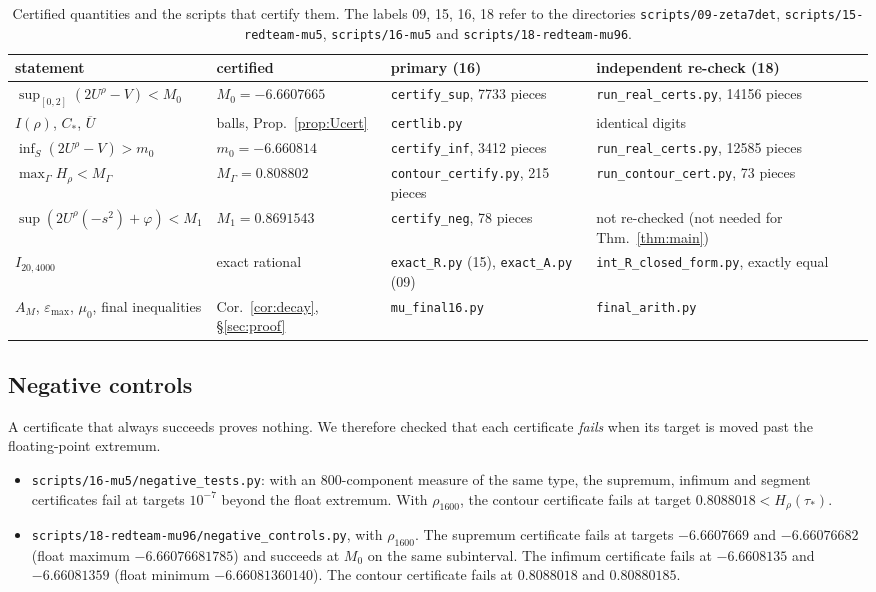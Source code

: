 \documentclass[11pt]{article}
\theoremstyle{remark}
\newcommand{\Ubar}{\overline{U}}
\newcommand{\epsmax}{\varepsilon_{\max}}
\newcommand{\file}[1]{\texttt{#1}}
\newcommand{\Cstar}{C_{*}}
\begin{document}
\begin{table}[ht]
\centering
\small
\begin{tabular}{>{\raggedright}p{3.9cm}>{\raggedright}p{3.0cm}>{\raggedright}p{3.4cm}>{\raggedright\arraybackslash}p{4.2cm}}
\toprule
statement & certified & primary (16) & independent re-check (18)\\
\midrule
$\sup_{[0,2]}(2U^\rho-V)<M_0$ & $M_0=-6.6607665$ & \file{certify\_sup}, 7733 pieces & \file{run\_real\_certs.py}, 14156 pieces\\
$I(\rho)$, $\Cstar$, $\Ubar$ & balls, Prop.~\ref{prop:Ucert} & \file{certlib.py} & identical digits\\
$\inf_S(2U^\rho-V)>m_0$ & $m_0=-6.660814$ & \file{certify\_inf}, 3412 pieces & \file{run\_real\_certs.py}, 12585 pieces\\
$\max_\Gamma H_\rho<M_\Gamma$ & $M_\Gamma=0.808802$ & \file{contour\_certify.py}, 215 pieces & \file{run\_contour\_cert.py}, 73 pieces\\
$\sup(2U^\rho(-s^2)+\varphi)<M_1$ & $M_1=0.8691543$ & \file{certify\_neg}, 78 pieces & not re-checked (not needed for Thm.~\ref{thm:main})\\
$I_{20,4000}$ & exact rational & \file{exact\_R.py} (15), \file{exact\_A.py} (09) & \file{int\_R\_closed\_form.py}, exactly equal\\
$A_M$, $\epsmax$, $\mu_0$, final inequalities & Cor.~\ref{cor:decay}, \S\ref{sec:proof} & \file{mu\_final16.py} & \file{final\_arith.py}\\
\bottomrule
\end{tabular}
\caption{Certified quantities and the scripts that certify them. The labels 09, 15, 16, 18 refer to the directories \file{scripts/09-zeta7det}, \file{scripts/15-redteam-mu5}, \file{scripts/16-mu5} and \file{scripts/18-redteam-mu96}.}
\label{tab:certs}
\end{table}

\subsection{Negative controls}

A certificate that always succeeds proves nothing. We therefore checked that each certificate \emph{fails} when its target is moved past the floating-point extremum.
\begin{itemize}
\item \file{scripts/16-mu5/negative\_tests.py}: with an $800$-component measure of the same type, the supremum, infimum and segment certificates fail at targets $10^{-7}$ beyond the float extremum. With $\rho_{1600}$, the contour certificate fails at target $0.8088018<H_\rho(\tau_*)$.
\item \file{scripts/18-redteam-mu96/negative\_controls.py}, with $\rho_{1600}$. The supremum certificate fails at targets $-6.6607669$ and $-6.66076682$ (float maximum $-6.66076681785$) and succeeds at $M_0$ on the same subinterval. The infimum certificate fails at $-6.6608135$ and $-6.66081359$ (float minimum $-6.66081360140$). The contour certificate fails at $0.8088018$ and $0.80880185$.
\end{itemize}
\end{document}
